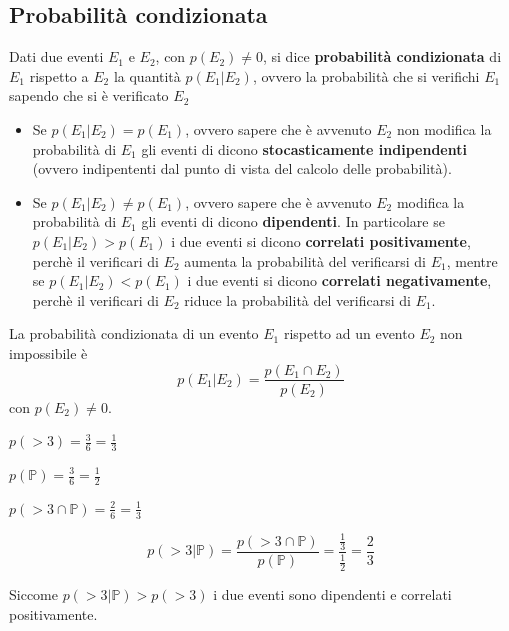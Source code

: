 \documentclass{article}     %
\begin{document}
            \subsection{Probabilità condizionata}
                \begin{boxdef}
                    Dati due eventi $E_1$ e $E_2$, con $p(E_2)\neq 0$, si dice \textbf{probabilità condizionata} di $E_1$ rispetto a $E_2$ la quantità $p(E_1|E_2)$, ovvero la probabilità che si verifichi $E_1$ sapendo che si è verificato $E_2$
                \end{boxdef}
                \begin{itemize}
                    \item Se $p(E_1|E_2)=p(E_1)$, ovvero sapere che è avvenuto $E_2$ non modifica la probabilità di $E_1$ gli eventi di dicono \textbf{stocasticamente indipendenti} (ovvero indipententi dal punto di vista del calcolo delle probabilità).
                    \item Se $p(E_1|E_2)\neq p(E_1)$, ovvero sapere che è avvenuto $E_2$ modifica la probabilità di $E_1$ gli eventi di dicono \textbf{dipendenti}. In particolare se $p(E_1|E_2) > p(E_1)$ i due eventi si dicono \textbf{correlati positivamente}, perchè il verificari di $E_2$ aumenta la probabilità del verificarsi di $E_1$, mentre se $p(E_1|E_2)< p(E_1)$ i due eventi si dicono \textbf{correlati negativamente}, perchè il verificari di $E_2$ riduce la probabilità del verificarsi di $E_1$.
                \end{itemize}
                 
                \begin{thm}
                    La probabilità condizionata di un evento $E_1$ rispetto ad un evento $E_2$ non impossibile è \[p(E_1|E_2)=\frac{p(E_1\cap E_2)}{p(E_2)}\]
                    con $p(E_2)\neq 0$.
                \end{thm}

                \begin{ex}
                
                $p(>3)=\frac{3}{6}=\frac{1}{3}$

                $p(\mathbb{P})=\frac{3}{6}=\frac{1}{2}$

                $p(>3\cap\mathbb{P})=\frac{2}{6}=\frac{1}{3}$

                \[p(>3|\mathbb{P})=\frac{p(>3\cap\mathbb{P})}{p(\mathbb{P})}=\frac{\frac{1}{3}}{\frac{1}{2}}=\frac{2}{3}\]

                Siccome $p(>3|\mathbb{P})>p(>3)$ i due eventi sono dipendenti e correlati positivamente.
            \end{ex}
\end{document}
